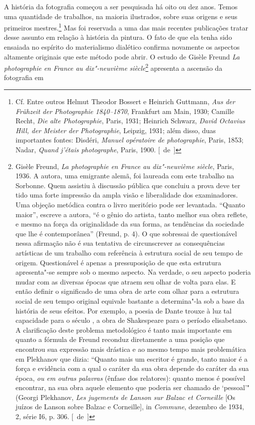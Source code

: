 A história da fotografia começou a ser pesquisada há oito ou dez anos.
Temos uma quantidade de trabalhos, na maioria ilustrados, sobre suas
origens e seus primeiros mestres.\footnote{Cf. Entre outros Helmut
  Theodor Bossert e Heinrich Guttmann, \emph{Aus der Frühzeit der
  Photographie 1840--1870}, Frankfurt am Main, 1930; Camille Recht,
  \emph{Die alte Photographie}, Paris, 1931; Heinrich Schwarz,
  \emph{David Octavius Hill, der Meister der Photographie}, Leipzig,
  1931; além disso, duas importantes fontes: Disdéri, \emph{Manuel
  opératoire de photographie}, Paris, 1853; Nadar, \emph{Quand
  j'étais photographe}, Paris, 1900. [~de~]} Mas foi reservada a uma das mais recentes
publicações tratar desse assunto em relação à história da
pintura. O fato de que ela tenha sido ensaiada no espírito do materialismo
dialético confirma novamente os aspectos altamente
originais que este método pode abrir. O estudo de Gisèle Freund \emph{La
photographie en France au dix"-neuvième siècle}\footnote{Gisèle Freund,
  \emph{La photographie en France au dix"-neuvième siècle}, Paris, 1936. A
  autora, uma emigrante alemã, foi laureada com este trabalho na
  Sorbonne. Quem assistiu à discussão pública que concluiu a prova deve
  ter tido uma forte impressão da ampla visão e liberalidade dos
  examinadores. Uma objeção metódica contra o livro meritório pode ser
  levantada. ``Quanto maior'', escreve a autora, ``é o gênio do artista,
  tanto melhor sua obra reflete, e mesmo na força da originalidade da
  sua forma, as tendências da sociedade que lhe é contemporânea''
  (Freund, p. 4). O que sobressai de questionável nessa afirmação não é
  sua tentativa de circunscrever as consequências artísticas de um
  trabalho com referência à estrutura social de seu tempo de origem.
  Questionável é apenas a pressuposição de que esta estrutura
  apresenta"-se sempre sob o mesmo aspecto. Na verdade, o seu aspecto
  poderia mudar com as diversas épocas que atraem seu olhar de volta
  para elas. E então definir o significado de uma obra de arte com olhar
  para a estrutura social de seu tempo original equivale bastante a
  determina"-la sob a base da história de seus efeitos. Por exemplo, a
  poesia de Dante trouxe à luz tal capacidade para o século , a obra
  de Shakespeare para o período elisabetano. A clarificação deste
  problema metodológico é tanto mais importante em quanto a fórmula de
  Freund reconduz diretamente a uma posição que encontrou sua
  expressão mais drástica e ao mesmo tempo mais problemática em
  Plekhanov que dizia: ``Quanto mais um escritor é grande, tanto maior é
  a força e evidência com a qual o caráter da sua obra depende do
  caráter da sua época, \emph{ou em outras palavras} (ênfase dos
  relatores): quanto menos é possível encontrar, na sua obra aquele
  elemento que poderia ser chamado de `pessoal'" (Georgi Plekhanov,
  \emph{Les jugements de Lanson sur Balzac et Corneille} {[}Os juízos de
  Lanson sobre Balzac e Corneille{]}, in \emph{Commune}, dezembro de
  1934, 2, série I6, p. 306. [~de~]} apresenta a ascensão da fotografia em

